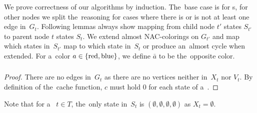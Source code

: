 We prove correctness of our algorithms by induction.
The~base case is for \LeafNode{}s, for other nodes we split the~reasoning for cases where
there is or is not at least one edge in~\( G_t \).
%
Following lemmas always show mapping from child node \( t' \) states \( S_{t'} \)
to parent node \( t \) states \( S_t \).
We extend almost NAC-colorings on \( G_{t'} \) and
map which states in~\( S_{t'} \) map to which state in~\( S_t \)
or produce an~almost cycle when extended.
%
For a~color \( a \in \{\text{red}, \text{blue}\} \),
we define \( \bar{a} \) to be the~opposite color.

\subsubsection*{\LeafNode{}}

%
\begin{proof}
	There are no edges in~\( G_t \) as there are no vertices
	neither in~\( X_t \) nor \( V_t \).
	By definition of the~cache function,
	\( c \) must hold \( 0 \) for each state of a~\LeafNode{}.
\end{proof}
%
Note that for a~\LeafNode{} \( t \in T \),
the~only state in~\( S_t \) is \( (\emptyset, \emptyset, \emptyset, \emptyset) \)
as \( X_t = \emptyset \).

\subsubsection*{\IntroduceVertexNode{}}

